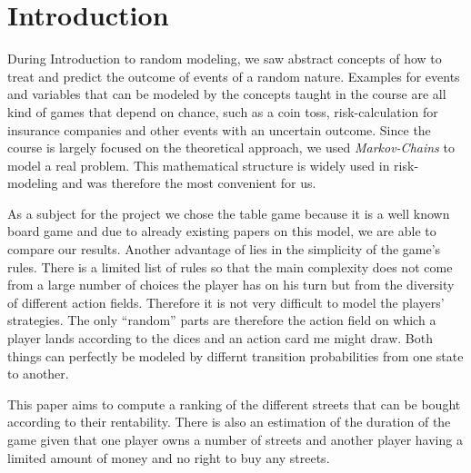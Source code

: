\section{Introduction} %
\label{sec:introduction}

During Introduction to random modeling, we saw abstract concepts of how to treat and predict the 
outcome of events of a random nature. Examples for events and variables that can be modeled by the 
concepts taught in the course are all kind of games that depend on chance, such as a coin toss, 
risk-calculation for insurance companies and other events with an uncertain outcome. Since the course
is largely focused on the theoretical approach, we used \textit{Markov-Chains} to model 
a real problem. This mathematical structure is widely used in risk-modeling and was therefore the
most convenient for us. 

As a subject for the project we chose the table game \monopoly because it is a well known board game and 
due to already existing papers on this model, we are able to compare our results. 
Another advantage of \monopoly lies in the simplicity of the game's rules. 
There is a limited list of rules so that the main complexity does not come from a large number 
of choices the player has on his turn but from the diversity of different action fields. Therefore it is not
very difficult to model the players' strategies. 
The only ``random'' parts are therefore the action field on which a player lands according to the dices
and an action card me might draw. 
Both things can perfectly be modeled by differnt transition probabilities from one state to another.

This paper aims to compute a ranking of the different streets that can be bought according to their rentability. 
There is also an estimation of the duration of the game given that one player owns a number
of streets and another player having a limited amount of money and no right to buy any streets.

